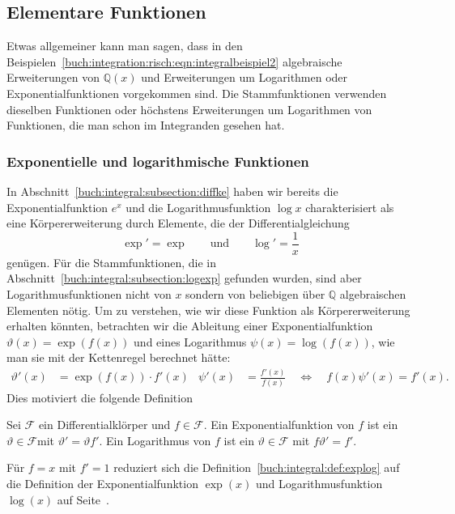 %
%
%
\subsection{Elementare Funktionen
\label{buch:integral:subsection:elementar}}
Etwas allgemeiner kann man sagen, dass in den
Beispielen~\eqref{buch:integration:risch:eqn:integralbeispiel2}
algebraische Erweiterungen von $\mathbb{Q}(x)$ und Erweiterungen
um Logarithmen oder Exponentialfunktionen vorgekommen sind.
Die Stammfunktionen verwenden dieselben Funktionen oder höchstens
Erweiterungen um Logarithmen von Funktionen, die man schon im
Integranden gesehen hat.

%
%
\subsubsection{Exponentielle und logarithmische Funktionen}
In Abschnitt~\ref{buch:integral:subsection:diffke} haben wir
bereits die Exponentialfunktion $e^x$ und die Logarithmusfunktion 
$\log x$ charakterisiert als eine Körpererweiterung durch 
Elemente, die der Differentialgleichung
\[
\exp' = \exp
\qquad\text{und}\qquad
\log' = \frac{1}{x}
\]
genügen.
Für die Stammfunktionen, die in 
Abschnitt~\ref{buch:integral:subsection:logexp}
gefunden wurden, sind aber Logarithmusfunktionen nicht von
$x$ sondern von beliebigen über $\mathbb{Q}$ algebraischen Elementen
nötig.
Um zu verstehen, wie wir diese Funktion als Körpererweiterung erhalten
könnten, betrachten wir die Ableitung einer Exponentialfunktion
$\vartheta(x) = \exp(f(x))$ und eines
Logarithmus 
$\psi(x) = \log(f(x))$, wie man sie mit der Kettenregel
berechnet hätte:
\begin{align*}
\vartheta'(x)
&=\exp(f(x)) \cdot f'(x)
&
\psi'(x)
&=
\frac{f'(x)}{f(x)}
\quad\Leftrightarrow\quad
f(x)\psi'(x)
=
f'(x).
\end{align*}
Dies motiviert die folgende Definition

\begin{definition}
\label{buch:integral:def:explog}
Sei $\mathscr{F}$ ein Differentialklörper und $f\in\mathscr{F}$.
Ein Exponentialfunktion von $f$ ist ein $\vartheta\in \mathscr{F}$mit
$\vartheta' = \vartheta f'$.
Ein Logarithmus von $f$ ist ein $\vartheta\in\mathscr{F}$ mit
$f\vartheta'=f'$.
\end{definition}

Für $f=x$ mit $f'=1$ reduziert sich die 
Definition~\ref{buch:integral:def:explog}
auf die Definition der Exponentialfunktion $\exp(x)$ und
Logarithmusfunktion $\log(x)$ auf Seite~\pageref{buch:integral:expundlog}.


